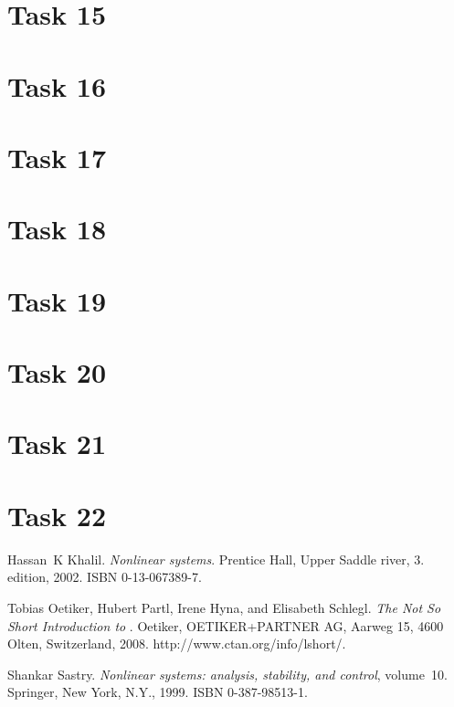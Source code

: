 \documentclass[a4paper,12pt,oneside,onecolumn]{article} %
\begin{document}
\section*{Task 15}
%

\section*{Task 16}
%

\section*{Task 17}
%

\section*{Task 18}
%

\section*{Task 19}
%

\section*{Task 20}
%

\section*{Task 21}
%

\section*{Task 22}
%




\begin{thebibliography}{99}
Hassan~K Khalil.
\newblock \emph{Nonlinear systems}.
\newblock Prentice Hall, Upper Saddle river, 3. edition, 2002.
\newblock ISBN 0-13-067389-7.

Tobias Oetiker, Hubert Partl, Irene Hyna, and Elisabeth Schlegl.
\newblock \emph{The Not So Short Introduction to \LaTeXe}.
\newblock Oetiker, OETIKER+PARTNER AG, Aarweg 15, 4600 Olten, Switzerland,
  2008.
\newblock http://www.ctan.org/info/lshort/.

Shankar Sastry.
\newblock \emph{Nonlinear systems: analysis, stability, and control},
  volume~10.
\newblock Springer, New York, N.Y., 1999.
\newblock ISBN 0-387-98513-1.
\end{thebibliography}
\end{document}
